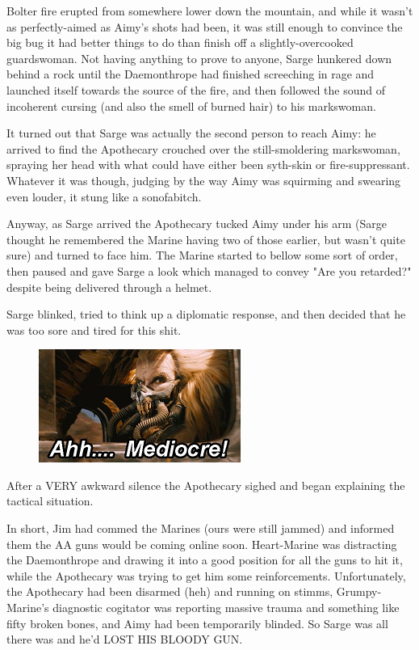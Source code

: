 Bolter fire erupted from somewhere lower down the mountain, and while it wasn't as perfectly-aimed as Aimy's shots had been, it was still enough to convince the big bug it had better things to do than finish off a slightly-overcooked guardswoman. 
Not having anything to prove to anyone, Sarge hunkered down behind a rock until the Daemonthrope had finished screeching in rage and launched itself towards the source of the fire, and then followed the sound of incoherent cursing (and also the smell of burned hair) to his markswoman.

It turned out that Sarge was actually the second person to reach Aimy: 
he arrived to find the Apothecary crouched over the still-smoldering markswoman, spraying her head with what could have either been syth-skin or fire-suppressant. 
Whatever it was though, judging by the way Aimy was squirming and swearing even louder, it stung like a sonofabitch. 


Anyway, as Sarge arrived the Apothecary tucked Aimy under his arm (Sarge thought he remembered the Marine having two of those earlier, but wasn't quite sure) and turned to face him. 
The Marine started to bellow some sort of order, then paused and gave Sarge a look which managed to convey "Are you retarded?" despite being delivered through a helmet.



Sarge blinked, tried to think up a diplomatic response, and then decided that he was too sore and tired for this shit.



\begin{figure}
	\begin{center}
		\includegraphics[width=\figwidth]{pics/16/54.png}
	\end{center}
\end{figure}
After a VERY awkward silence the Apothecary sighed and began explaining the tactical situation.

In short, Jim had commed the Marines (ours were still jammed) and informed them the AA guns would be coming online soon. 
Heart-Marine was distracting the Daemonthrope and drawing it into a good position for all the guns to hit it, while the Apothecary was trying to get him some reinforcements. 
Unfortunately, the Apothecary had been disarmed (heh) and running on stimms, Grumpy-Marine's diagnostic cogitator was reporting massive trauma and something like fifty broken bones, and  Aimy had been temporarily blinded. 
So Sarge was all there was and he'd LOST HIS BLOODY GUN.

